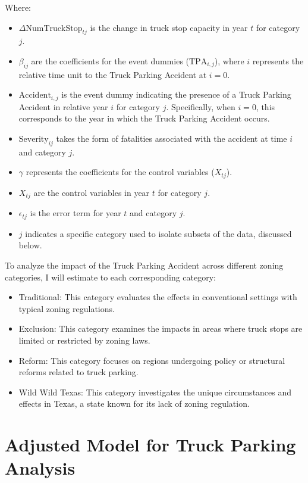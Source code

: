 \documentclass[
  12pt]{article}
\begin{document}
Where:

\begin{itemize}
\item
  \(\Delta\text{NumTruckStop}_{tj}\) is the change in truck stop
  capacity in year \(t\) for category \(j\).
\item
  \(\beta_{ij}\) are the coefficients for the event dummies
  (\(\text{TPA}_{i,j}\)), where \(i\) represents the relative time unit
  to the Truck Parking Accident at \(i = 0\).
\item
  \(\text{Accident}_{i,j}\) is the event dummy indicating the presence
  of a Truck Parking Accident in relative year \(i\) for category \(j\).
  Specifically, when \(i = 0\), this corresponds to the year in which
  the Truck Parking Accident occurs.
\item
  \(\text{Severity}_{ij}\) takes the form of fatalities associated with
  the accident at time \(i\) and category \(j\).
\item
  \(\gamma\) represents the coefficients for the control variables
  (\(X_{tj}\)).
\item
  \(X_{tj}\) are the control variables in year \(t\) for category \(j\).
\item
  \(\epsilon_{tj}\) is the error term for year \(t\) and category \(j\).
\item
  \(j\) indicates a specific category used to isolate subsets of the
  data, discussed below.
\end{itemize}

To analyze the impact of the Truck Parking Accident across different
zoning categories, I will estimate to each corresponding category:

\begin{itemize}
\item
  Traditional: This category evaluates the effects in conventional
  settings with typical zoning regulations.
\item
  Exclusion: This category examines the impacts in areas where truck
  stops are limited or restricted by zoning laws.
\item
  Reform: This category focuses on regions undergoing policy or
  structural reforms related to truck parking.
\item
  Wild Wild Texas: This category investigates the unique circumstances
  and effects in Texas, a state known for its lack of zoning regulation.
\end{itemize}

\section{Adjusted Model for Truck Parking
Analysis}\label{adjusted-model-for-truck-parking-analysis}
\end{document}
